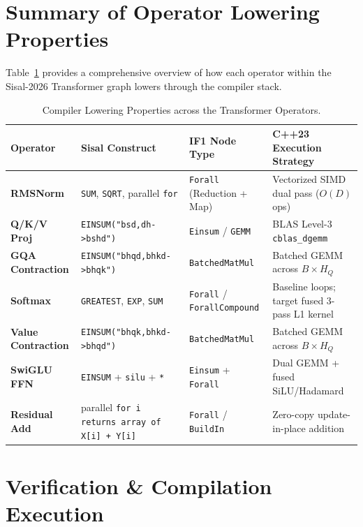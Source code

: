 \section{Summary of Operator Lowering Properties}
\label{sec:op_summary_table}

Table~\ref{tab:transformer_op_summary} provides a comprehensive overview of how each operator within the Sisal-2026 Transformer graph lowers through the compiler stack.

\begin{table}[htbp]
\centering
\caption{Compiler Lowering Properties across the Transformer Operators.}
\label{tab:transformer_op_summary}
\small
\begin{tabularx}{\textwidth}{>{\raggedright\arraybackslash}p{2.5cm} >{\raggedright\arraybackslash}p{3.2cm} >{\raggedright\arraybackslash}p{3.2cm} >{\raggedright\arraybackslash}X}
\toprule
\textbf{Operator} & \textbf{Sisal Construct} & \textbf{IF1 Node Type} & \textbf{C++23 Execution Strategy} \\
\midrule
\textbf{RMSNorm} & \texttt{SUM}, \texttt{SQRT}, parallel \texttt{for} & \texttt{Forall} (Reduction + Map) & Vectorized SIMD dual pass ($O(D)$ ops) \\
\textbf{Q/K/V Proj} & \texttt{EINSUM("bsd,dh->bshd")} & \texttt{Einsum} / \texttt{GEMM} & BLAS Level-3 \texttt{cblas\_dgemm} \\
\textbf{GQA Contraction} & \texttt{EINSUM("bhqd,bhkd->bhqk")} & \texttt{BatchedMatMul} & Batched GEMM across $B \times H_Q$ \\
\textbf{Softmax} & \texttt{GREATEST}, \texttt{EXP}, \texttt{SUM} & \texttt{Forall} / \texttt{ForallCompound} & Baseline loops; target fused 3-pass L1 kernel \\
\textbf{Value Contraction} & \texttt{EINSUM("bhqk,bhkd->bhqd")} & \texttt{BatchedMatMul} & Batched GEMM across $B \times H_Q$ \\
\textbf{SwiGLU FFN} & \texttt{EINSUM} + \texttt{silu} + \texttt{*} & \texttt{Einsum} + \texttt{Forall} & Dual GEMM + fused SiLU/Hadamard \\
\textbf{Residual Add} & parallel \texttt{for i returns array of X[i] + Y[i]} & \texttt{Forall} / \texttt{BuildIn} & Zero-copy update-in-place addition \\
\bottomrule
\end{tabularx}
\end{table}

\section{Verification \& Compilation Execution}
\label{sec:verification}

